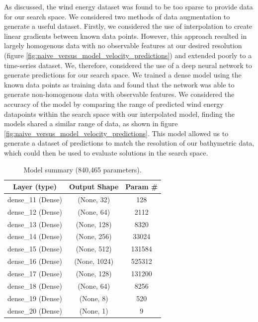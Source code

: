 \documentclass[preprint,12pt]{elsarticle}
\begin{document}
As discussed, the wind energy dataset was found to be too sparse to provide data for our search space. We considered two methods of data augmentation to generate a useful dataset. Firstly, we considered the use of interpolation to create linear gradients between known data points. However, this approach resulted in largely homogenous data with no observable features at our desired resolution (figure \ref{fig:naive_versus_model_velocity_predictions}) and extended poorly to a time-series dataset. We, therefore, considered the use of a deep neural network to generate predictions for our search space. We trained a dense model using the known data points as training data and found that the network was able to generate non-homogenous data with observable features. We considered the accuracy of the model by comparing the range of predicted wind energy datapoints within the search space with our interpolated model, finding the models shared a similar range of data, as shown in figure \ref{fig:naive_versus_model_velocity_predictions}. This model allowed us to generate a dataset of predictions to match the resolution of our bathymetric data, which could then be used to evaluate solutions in the search space.

\newpage
\begin{table}[h!]
    \centering
    \begin{tabular}{||c|c|c||}
        \hline
        Layer (type) & Output Shape & Param \# \\
        \hline
        dense\_11 (Dense) & (None, 32) & 128 \\
        \hline
        dense\_12 (Dense) & (None, 64) & 2112 \\
        \hline
        dense\_13 (Dense) & (None, 128) & 8320 \\
        \hline
        dense\_14 (Dense) & (None, 256) & 33024 \\
        \hline
        dense\_15 (Dense) & (None, 512) & 131584 \\
        \hline
        dense\_16 (Dense) & (None, 1024) & 525312 \\
        \hline
        dense\_17 (Dense) & (None, 128) & 131200 \\
        \hline
        dense\_18 (Dense) & (None, 64) & 8256 \\
        \hline
        dense\_19 (Dense) & (None, 8) & 520 \\
        \hline
        dense\_20 (Dense) & (None, 1) & 9 \\
        \hline
    \end{tabular}
    \caption{Model summary (840,465 parameters).}
    \label{table:velocity_model_summary}
\end{table}
\end{document}
